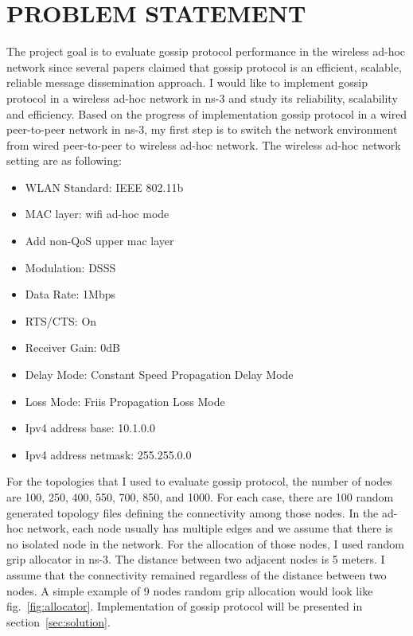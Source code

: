 \chapter{PROBLEM STATEMENT}

The project goal is to evaluate gossip protocol performance in the wireless ad-hoc network since several papers\cite{gossip}\cite{gossip2} claimed that gossip protocol is an efficient, scalable, reliable message dissemination approach. I would like to implement gossip protocol in a wireless ad-hoc network in ns-3 and study its reliability, scalability and efficiency. Based on the progress of implementation gossip protocol in a wired peer-to-peer network in ns-3, my first step is to switch the network environment from wired peer-to-peer to wireless ad-hoc network. The wireless ad-hoc network setting are as following:

\begin{itemize}
	\item WLAN Standard: IEEE 802.11b
	\item MAC layer: wifi ad-hoc mode
	\item Add non-QoS upper mac layer
	\item Modulation: DSSS
	\item Data Rate: 1Mbps
	\item RTS/CTS: On
	\item Receiver Gain: 0dB
	\item Delay Mode: Constant Speed Propagation Delay Mode
	\item Loss Mode: Friis Propagation Loss Mode
	\item Ipv4 address base: 10.1.0.0
	\item Ipv4 address netmask: 255.255.0.0
\end{itemize}

For the topologies that I used to evaluate gossip protocol, the number of nodes are 100, 250, 400, 550, 700, 850, and 1000. For each case, there are 100 random generated topology files defining the connectivity among those nodes. In the ad-hoc network, each node usually has multiple edges and we assume that there is no isolated node in the network. For the allocation of those nodes, I used random grip allocator in ns-3. The distance between two adjacent nodes is 5 meters. I assume that the connectivity remained regardless of the distance between two nodes. A simple example of 9 nodes random grip allocation would look like fig.~\ref{fig:allocator}. Implementation of gossip protocol will be presented in section~\ref{sec:solution}. 

